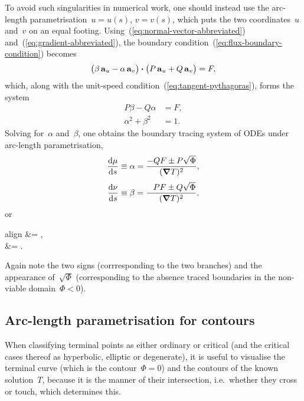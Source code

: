 To avoid such singularities in numerical work, one should instead use
the arc-length parametrisation~$u = u (s)$, $v = v(s)$,
which puts the two coordinates~$u$ and~$v$ on an equal footing.
Using~(\ref{eq:normal-vector-abbreviated})
and~(\ref{eq:gradient-abbreviated}),
the boundary condition~(\ref{eq:flux-boundary-condition}) becomes
\[
  \roundbr[\big]{\beta \basisvec{u} - \alpha \basisvec{v}}
    \dotp
  \roundbr[\big]{P \basisvec{u} + Q \basisvec{v}}
    =
  F,
\]
which, along with the unit-speed condition~(\ref{eq:tangent-pythagoras}),
forms the system
\begin{align}
  P \beta - Q \alpha &= F,
    \label{eq:tracing-arc-length-parametrisation-flux-boundary-condition} \\
  \alpha^2 + \beta^2 &= 1.
    \label{eq:tracing-arc-length-parametrisation-unit-speed}
\end{align}
Solving for~$\alpha$ and~$\beta$, one obtains
the boundary tracing system of ODEs under arc-length parametrisation,
\begin{align}
  \tder{\mu}{s} &\defeq \alpha = \frac{-Q F \pm P \sqrt{\Phi}}{(\del T)^2},
    \label{eq:tracing-ode-arc-length-parametrisation-mu} \\[\fraclinespace]
  \tder{\nu}{s} &\defeq \beta = \frac{\+P F \pm Q \sqrt{\Phi}}{(\del T)^2},
    \label{eq:tracing-ode-arc-length-parametrisation-nu}
\end{align}
or
\begin{important}{align}
   &= ,
    \label{eq:tracing-ode-arc-length-parametrisation-u} \\[\fraclinespace]
   &= .
    \label{eq:tracing-ode-arc-length-parametrisation-v}
\end{important}
Again note the two signs (corrresponding to the two branches)
and the appearance of~$\sqrt{\Phi}$
(corresponding to the absence traced boundaries
in the non-viable domain~$\Phi < 0$).

\subsection{Arc-length parametrisation for contours}
\label{sec:curvilinear.tracing.arc-length-contours}

When classifying terminal points as either ordinary or critical
(and the critical cases thereof as hyperbolic, elliptic or degenerate),
it is useful to visualise the terminal curve (which is the contour~$\Phi = 0$)
and the contours of the known solution~$T$,
because it is the manner of their intersection,
i.e.~whether they cross or touch,
which determines this.

